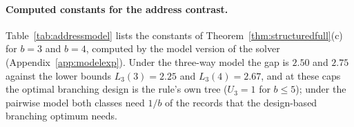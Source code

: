 \paragraph{Computed constants for the address contrast.}
Table~\ref{tab:addressmodel} lists the constants of
Theorem~\ref{thm:structuredfull}(c) for $b=3$ and $b=4$, computed by the
model version of the solver (Appendix~\ref{app:modelexp}). Under the
three-way model the gap is $2.50$ and $2.75$ against the lower bounds
$L_3(3)=2.25$ and $L_3(4)=2.67$, and at these caps the optimal branching
design is the rule's own tree ($U_3=1$ for $b\le5$); under the pairwise model
both classes need $1/b$ of the records that the design-based branching
optimum needs.

